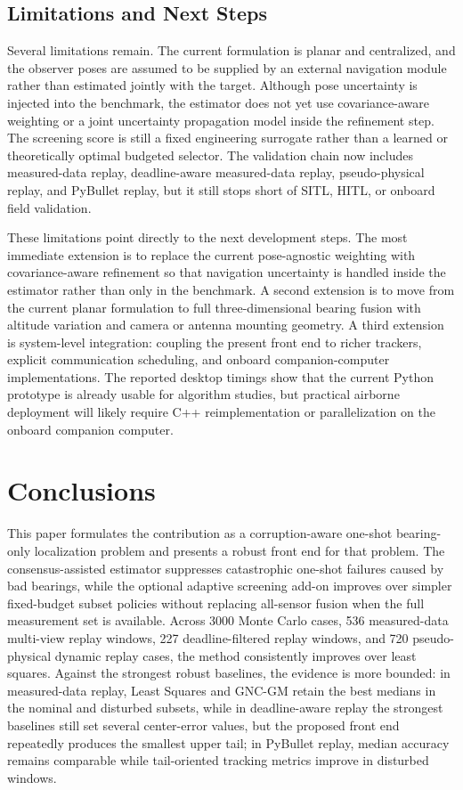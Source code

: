 \documentclass[drones,article,submit,pdftex,moreauthors]{Definitions/mdpi}
\begin{document}
\subsection{Limitations and Next Steps}

Several limitations remain. The current formulation is planar and centralized, and the observer poses are assumed to be supplied by an external navigation module rather than estimated jointly with the target. Although pose uncertainty is injected into the benchmark, the estimator does not yet use covariance-aware weighting or a joint uncertainty propagation model inside the refinement step. The screening score is still a fixed engineering surrogate rather than a learned or theoretically optimal budgeted selector. The validation chain now includes measured-data replay, deadline-aware measured-data replay, pseudo-physical replay, and PyBullet replay, but it still stops short of SITL, HITL, or onboard field validation.

These limitations point directly to the next development steps. The most immediate extension is to replace the current pose-agnostic weighting with covariance-aware refinement so that navigation uncertainty is handled inside the estimator rather than only in the benchmark. A second extension is to move from the current planar formulation to full three-dimensional bearing fusion with altitude variation and camera or antenna mounting geometry. A third extension is system-level integration: coupling the present front end to richer trackers, explicit communication scheduling, and onboard companion-computer implementations. The reported desktop timings show that the current Python prototype is already usable for algorithm studies, but practical airborne deployment will likely require C++ reimplementation or parallelization on the onboard companion computer.

\section{Conclusions}

This paper formulates the contribution as a corruption-aware one-shot bearing-only localization problem and presents a robust front end for that problem. The consensus-assisted estimator suppresses catastrophic one-shot failures caused by bad bearings, while the optional adaptive screening add-on improves over simpler fixed-budget subset policies without replacing all-sensor fusion when the full measurement set is available. Across 3000 Monte Carlo cases, 536 measured-data multi-view replay windows, 227 deadline-filtered replay windows, and 720 pseudo-physical dynamic replay cases, the method consistently improves over least squares. Against the strongest robust baselines, the evidence is more bounded: in measured-data replay, Least Squares and GNC-GM retain the best medians in the nominal and disturbed subsets, while in deadline-aware replay the strongest baselines still set several center-error values, but the proposed front end repeatedly produces the smallest upper tail; in PyBullet replay, median accuracy remains comparable while tail-oriented tracking metrics improve in disturbed windows.
\end{document}
